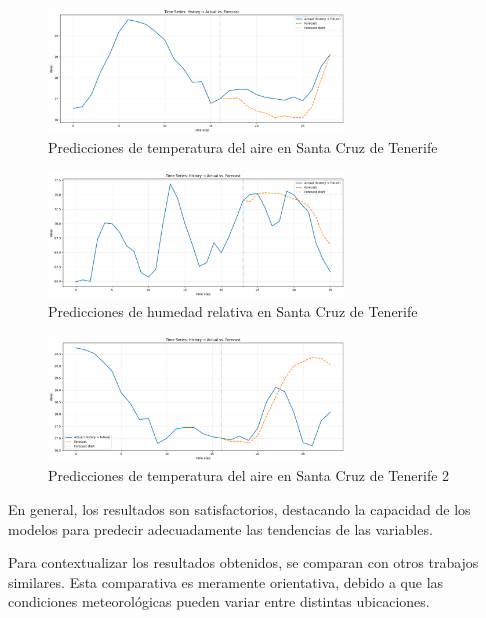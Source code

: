 \begin{figure}
    \centering
    \includegraphics[width=0.7\textwidth]{images/grafico_f12_temp.png}
    \caption{Predicciones de temperatura del aire en Santa Cruz de Tenerife}
    \label{temp_sct}
\end{figure}


\begin{figure}
    \centering
    \includegraphics[width=0.7\textwidth]{images/grafico_f12_hum.png}
    \caption{Predicciones de humedad relativa en Santa Cruz de Tenerife}
    \label{hum_sct}
\end{figure}

\begin{figure}
    \centering
    \includegraphics[width=0.7\textwidth]{images/grafico_f12_temp_mal.png}
    \caption{Predicciones de temperatura del aire en Santa Cruz de Tenerife 2}
    \label{temp_sct_error}
\end{figure}

En general, los resultados son satisfactorios, destacando la capacidad de los modelos para predecir adecuadamente las tendencias de las variables.

Para contextualizar los resultados obtenidos, se comparan con otros trabajos similares.
Esta comparativa es meramente orientativa, debido a que las condiciones meteorológicas pueden variar entre distintas ubicaciones.

